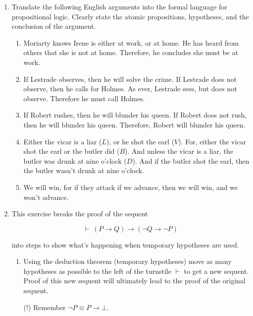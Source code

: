 \documentclass[11pt]{report}
\begin{document}
\begin{enumerate}
	
	\item Translate the following English arguments into the formal language for propositional logic. Clearly state the atomic propositions, hypotheses, and the conclusion of the argument. 
	
	\begin{enumerate}
		\item Moriarty knows Irene is either at work, or at home. He has heard from others that she is not at home. Therefore, he concludes she must be at work.
		
		\item  If Lestrade observes, then he will solve the crime. If Lestrade does not observe, then he calls for Holmes. As ever, Lestrade sees, but does not observe. Therefore he must call Holmes. 
		
		\item If Robert rushes, then he will blunder his queen. If Robert does not rush, then he will blunder his queen. Therefore, Robert will blunder his queen.
		
		\item Either the vicar is a liar ($L$), or he shot the earl ($V$). For, either the vicar shot the earl or the butler did ($B$). And unless the vicar is a liar, the butler was drunk at nine o'clock ($D$). And if the butler shot the earl, then the butler wasn't drunk at nine o'clock.

		\item We will win, for if they attack if we advance, then we will win, and we won't advance. 
	\end{enumerate}	

	\item This exercise breaks the proof of the sequent 
	
	$$\vdash \ (P \to Q) \to (\lnot Q \to \lnot P)$$

	into steps to show what's happening when temporary hypotheses are used. 

	\begin{enumerate}

		\item Using the deduction theorem (temporary hypotheses) move as many hypotheses as possible to the left of the turnstile $\vdash$ to get a new sequent. Proof of this new sequent will ultimately lead to the proof of the original sequent. 
		
		(!) Remember $\lnot P \equiv P \to \bot$.


\end{enumerate}
\end{enumerate}
\end{document}
